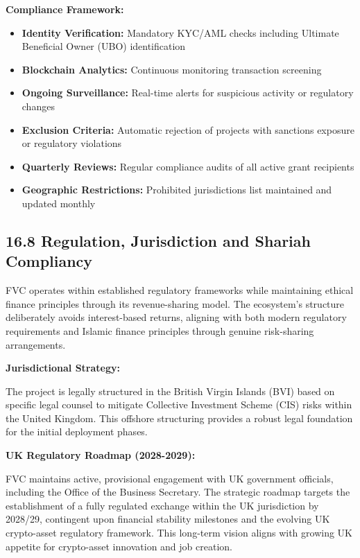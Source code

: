 \documentclass[
  paper=a4,
  ,captions=tableheading
]{scrartcl}
\providecommand{\tightlist}{%
  \setlength{\itemsep}{0pt}\setlength{\parskip}{0pt}}
\begin{document}
\textbf{Compliance Framework:}

\begin{itemize}
\tightlist
\item
  \textbf{Identity Verification:} Mandatory KYC/AML checks including
  Ultimate Beneficial Owner (UBO) identification
\item
  \textbf{Blockchain Analytics:} Continuous monitoring transaction
  screening
\item
  \textbf{Ongoing Surveillance:} Real-time alerts for suspicious
  activity or regulatory changes
\item
  \textbf{Exclusion Criteria:} Automatic rejection of projects with
  sanctions exposure or regulatory violations
\item
  \textbf{Quarterly Reviews:} Regular compliance audits of all active
  grant recipients
\item
  \textbf{Geographic Restrictions:} Prohibited jurisdictions list
  maintained and updated monthly
\end{itemize}

\subsection{16.8 Regulation, Jurisdiction and Shariah
Compliancy}\label{regulation-and-shariah-compliancy}

FVC operates within established regulatory frameworks while
maintaining ethical finance principles through its revenue-sharing
model. The ecosystem's structure deliberately avoids interest-based
returns, aligning with both modern regulatory requirements and Islamic
finance principles through genuine risk-sharing arrangements.

\textbf{Jurisdictional Strategy:}

The project is legally structured in the British Virgin Islands (BVI)
based on specific legal counsel to mitigate Collective Investment
Scheme (CIS) risks within the United Kingdom. This offshore structuring
provides a robust legal foundation for the initial deployment phases.

\textbf{UK Regulatory Roadmap (2028-2029):}

FVC maintains active, provisional engagement with UK government
officials, including the Office of the Business Secretary. The
strategic roadmap targets the establishment of a fully regulated
exchange within the UK jurisdiction by 2028/29, contingent upon
financial stability milestones and the evolving UK crypto-asset
regulatory framework. This long-term vision aligns with growing UK
appetite for crypto-asset innovation and job creation.
\end{document}
